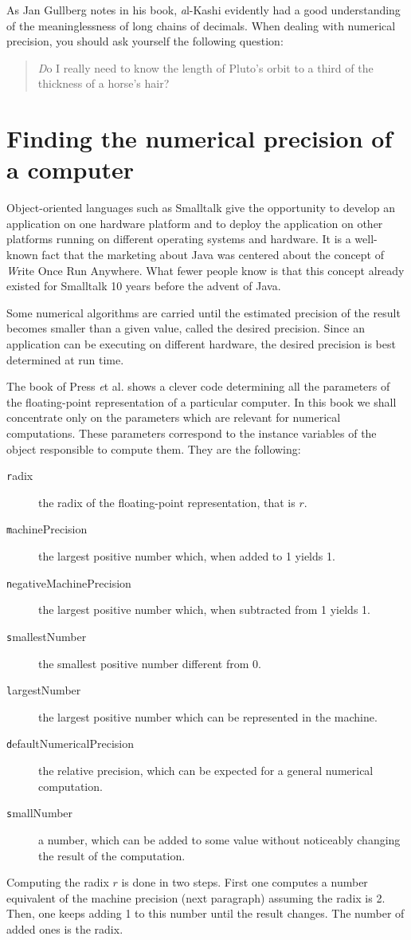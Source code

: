 As Jan Gullberg notes in his book, {\textit al-Kashi evidently had a
good understanding of the meaninglessness of long chains of
decimals}. When dealing with numerical precision, you should ask
yourself the following question:
\begin{quote}
{\textsl Do I really need to know the length of Pluto's orbit to a
third of the thickness of a horse's hair?}
\end{quote}

\section{Finding the numerical precision of a computer}
\label{sec:findprecision}
Object-oriented languages such as Smalltalk give the
opportunity to develop an application on one hardware platform and
to deploy the application on other platforms running on different
operating systems and hardware.
It is a well-known fact that the
marketing about Java was centered about the concept of {\textsl Write
Once Run Anywhere}.
What fewer people know is that this concept
already existed for Smalltalk 10 years before the advent of Java.

Some numerical algorithms are carried until the estimated
precision of the result becomes smaller than a given value, called
the desired precision. Since an application can be executing on
different hardware, the desired precision is best determined at
run time.

The book of Press {\textit et al.} \cite{Press} shows a clever code
determining all the parameters of the floating-point
representation of a particular computer. In this book we shall
concentrate only on the parameters which are relevant for
numerical computations. These parameters correspond to the
instance variables of the object responsible to compute them. They
are the following:
\begin{description}
\item[{\texttt radix}] the radix of the floating-point representation, that is $r$.
\item[{\texttt machinePrecision}] the largest positive number which, when added to 1 yields 1.
\item[{\texttt negativeMachinePrecision}] the largest positive number which, when subtracted from 1 yields 1.
\item[{\texttt smallestNumber}] the smallest positive number different from 0.
\item[{\texttt largestNumber}] the largest positive number which can be represented in the machine.
\item[{\texttt defaultNumericalPrecision}] the relative precision, which can be expected for a general numerical computation.
\item[{\texttt smallNumber}] a number, which can be added to some value without noticeably changing the result of the computation.
\end{description}
Computing the radix $r$ is done in two steps. First one computes a
number equivalent of the machine precision (\cf next paragraph)
assuming the radix is 2. Then, one keeps adding 1 to this number
until the result changes. The number of added ones is the radix.

